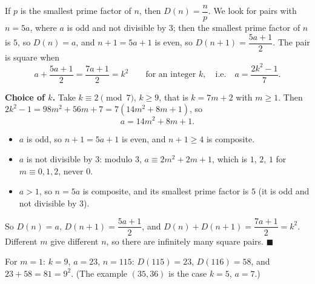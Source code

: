 If $p$ is the smallest prime factor of $n$, then $D(n)=\dfrac {n}{p}$. We look for pairs with $n=5a$, where $a$ is odd and not divisible by $3$; then the smallest prime factor of $n$ is $5$, so $D(n)=a$, and $n+1=5a+1$ is even, so $D(n+1)=\dfrac{5a+1}{2}$. The pair is square when
\[
a+\dfrac{5a+1}{2}=\dfrac{7a+1}{2}=k^2\qquad\text{for an integer }k,\quad\text{i.e.}\quad a=\dfrac{2k^2-1}{7}.
\]

\textbf{Choice of $k$.} Take $k\equiv2\pmod7$, $k\ge9$, that is $k=7m+2$ with $m\ge1$. Then $2k^2-1=98m^2+56m+7=7(14m^2+8m+1)$, so
\[
a=14m^2+8m+1 .
\]
\begin{itemize}
\item $a$ is odd, so $n+1=5a+1$ is even, and $n+1\ge4$ is composite.
\item $a$ is not divisible by $3$: modulo $3$, $a\equiv2m^2+2m+1$, which is $1$, $2$, $1$ for $m\equiv0,1,2$, never $0$.
\item $a>1$, so $n=5a$ is composite, and its smallest prime factor is $5$ (it is odd and not divisible by $3$).
\end{itemize}
So $D(n)=a$, $D(n+1)=\dfrac{5a+1}{2}$, and $D(n)+D(n+1)=\dfrac{7a+1}{2}=k^2$. Different $m$ give different $n$, so there are infinitely many square pairs. $\blacksquare$

For $m=1$: $k=9$, $a=23$, $n=115$: $D(115)=23$, $D(116)=58$, and $23+58=81=9^2$. (The example $(35,36)$ is the case $k=5$, $a=7$.)
